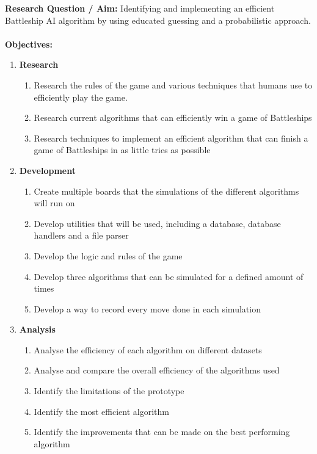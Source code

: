\documentclass[paper=a4, fontsize=11pt]{scrartcl}
\numberwithin{equation}{section} %
\numberwithin{figure}{section} %
\numberwithin{table}{section} %
\begin{document}
\textbf{Research Question / Aim:} Identifying and implementing an efficient Battleship AI algorithm by using educated guessing and a probabilistic approach.\\\\
\textbf{Objectives:} 
\begin{enumerate}
	\item \textbf{Research}
	    \begin{enumerate}
	        \item Research the rules of the game and various techniques that humans use to efficiently play the game.
	        \item Research current algorithms that can efficiently win a game of Battleships
	        \item Research techniques to implement an efficient algorithm that can finish a game of Battleships in as little tries as possible
	    \end{enumerate}
	\item \textbf{Development}
    	\begin{enumerate}
    	    \item Create multiple boards that the simulations of the different algorithms will run on
    	    \item Develop utilities that will be used, including a database, database handlers and a file parser
    	    \item Develop the logic and rules of the game
    	    \item Develop three algorithms that can be simulated for a defined amount of times
    	    \item Develop a way to record every move done in each simulation
    	\end{enumerate}
	\item \textbf{Analysis}
	    \begin{enumerate}
	        \item Analyse the efficiency of each algorithm on different datasets
	        \item Analyse and compare the overall efficiency of the algorithms used
	        \item Identify the limitations of the prototype
	        \item Identify the most efficient algorithm
	        \item Identify the improvements that can be made on the best performing algorithm
	    \end{enumerate}
\end{enumerate}
\end{document}
